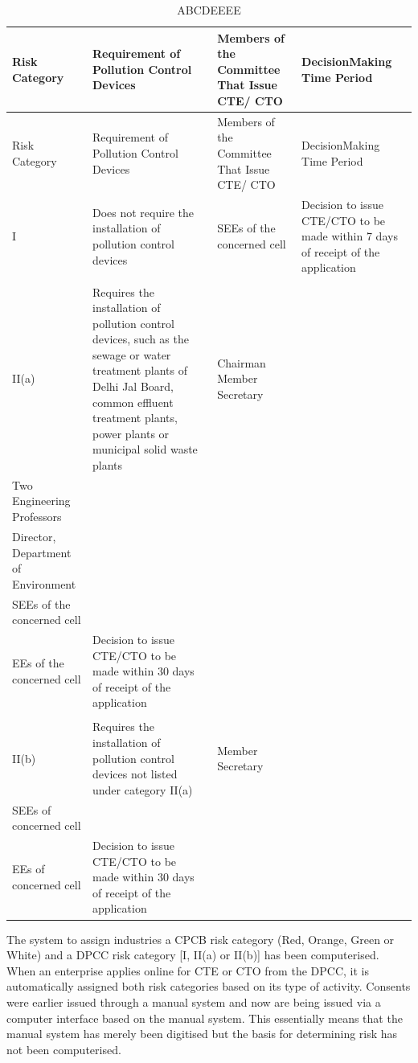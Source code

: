 \documentclass[a4paper, 12pt]{article}
\newcommand\tabitem{\makebox[1em][r]{\textbullet~}}
\begin{document}

\begin{longtable}{>{\raggedright}p{2cm}>{\raggedright}p{4cm}>{\raggedright}p{4cm}>{\raggedright\arraybackslash}p{4cm}}
\caption{ABCDEEEE} \\
Risk Category & Requirement of Pollution Control Devices & Members of the Committee That Issue CTE/ CTO & DecisionMaking Time Period \\
\midrule
\endfirsthead
Risk Category & Requirement of Pollution Control Devices & Members of the Committee That Issue CTE/ CTO & DecisionMaking Time Period \\
\midrule
\endhead
\endfoot
\endlastfoot

I & Does not require the installation of pollution control devices & SEEs of the concerned cell & Decision to issue CTE/CTO to be made within 7 days of receipt of the application \\
 & & &  \\
II(a) & Requires the installation of pollution control devices, such as the sewage or water treatment plants of Delhi Jal Board, common effluent treatment plants, power plants or municipal solid waste plants & \tabitem Chairman  \tabitem Member Secretary \\  \tabitem Two Engineering Professors \\ \tabitem Director, Department of Environment \\ \tabitem SEEs of the concerned cell \\ \tabitem EEs of the concerned cell 
 & Decision to issue CTE/CTO to be made within 30 days of receipt of the application \\
  & & & \\
II(b) & Requires the installation of pollution control devices not listed under category II(a) & \tabitem Member Secretary \\ \tabitem SEEs of concerned cell \\ \tabitem  EEs of concerned cell & Decision to issue CTE/CTO to be made within 30 days of receipt of the application \\

\end{longtable}
         
                 
                 The system to assign industries a CPCB risk category (Red, Orange, Green or White) and a DPCC risk category [I, II(a) or II(b)] has been computerised. When an enterprise applies online for CTE or CTO from the DPCC, it is automatically assigned both risk categories based on its type of activity. Consents were earlier issued through a manual system and now are being issued via a computer interface based on the manual system. This essentially means that the manual system has merely been digitised but the basis for determining risk has not been computerised. \\
\end{document}
